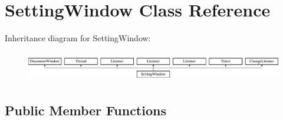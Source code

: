 \hypertarget{class_setting_window}{}\section{Setting\+Window Class Reference}
\label{class_setting_window}
Inheritance diagram for Setting\+Window\+:\begin{figure}[H]
\begin{center}
\leavevmode
\includegraphics[height=1.333333cm]{class_setting_window}
\end{center}
\end{figure}
\subsection*{Public Member Functions}
